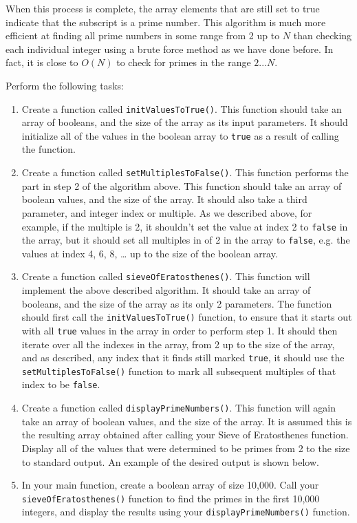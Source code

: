 \documentclass[11pt]{article}
\begin{document}
When this process is complete, the array elements that are still set
to true indicate that the subscript is a prime number.  This algorithm
is much more efficient at finding all prime numbers in some range from
2 up to $N$ than checking each individual integer using a brute force method
as we have done before.  In fact, it is close to $O(N)$ to check for primes
in the range $2 ... N$.

Perform the following tasks:

\begin{enumerate}
\item Create a function called \verb~initValuesToTrue()~.  This function should
take an array of booleans, and the size of the array as its input
parameters.  It should initialize all of the values in the boolean 
array to \verb~true~ as a result of calling the function.
\item Create a function called \verb~setMultiplesToFalse()~.  This function
performs the part in step 2 of the algorithm above.  This function
should take an array of boolean values, and the size of the array.
It should also take a third parameter, and integer index or
multiple.  As we described above, for example, if the multiple is
2, it shouldn't set the value at index 2 to \verb~false~ in the array,
but it should set all multiples in of 2 in the array to \verb~false~,
e.g. the values at index 4, 6, 8, \ldots{}  up to the size of the
boolean array.
\item Create a function called \verb~sieveOfEratosthenes()~.  This function
will implement the above described algorithm.  It should take
an array of booleans, and the size of the array as its only 2 parameters.
The function should first call the \verb~initValuesToTrue()~ function, to
ensure that it starts out with all \verb~true~ values in the array in
order to perform step 1.  It should then iterate over all the
indexes in the array, from 2 up to the size of the array, and as
described, any index that it finds still marked \verb~true~, it should
use the \verb~setMultiplesToFalse()~ function to mark all subsequent
multiples of that index to be \verb~false~.
\item Create a function called \verb~displayPrimeNumbers()~.  This function
will again take an array of boolean values, and the size of the
array.  It is assumed this is the resulting array obtained after
calling your Sieve of Eratosthenes function.  Display all of
the values that were determined to be primes from 2 to the size
to standard output.  An example of the desired output is shown below.
\item In your main function, create a boolean array of size 10,000.  Call your
\verb~sieveOfEratosthenes()~ function to find the primes in the first 10,000
integers, and display the results using your \verb~displayPrimeNumbers()~
function.
\end{enumerate}
\end{document}
